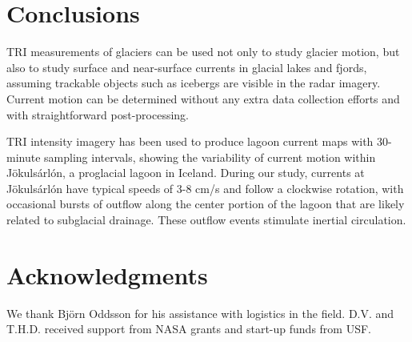 \section{Conclusions}
TRI measurements of glaciers can be used not only to study glacier motion, but also to study surface and near-surface currents in glacial lakes and fjords, assuming  trackable objects such as icebergs are visible in the radar imagery. Current motion can be determined without any extra data collection efforts and with straightforward post-processing. 

TRI intensity imagery has been used to produce lagoon current maps with 30-minute sampling intervals, showing the variability of current motion within Jökulsárlón, a proglacial lagoon in Iceland. During our study,  currents at Jökulsárlón have typical speeds of 3-8 cm/s and follow a clockwise rotation, with occasional bursts of outflow along the center portion of the lagoon that are likely related to subglacial drainage. These outflow events stimulate inertial circulation.


\section{Acknowledgments}
We thank Björn Oddsson for his assistance with logistics in the field. D.V. and T.H.D. received support from NASA grants and start-up funds from USF.


